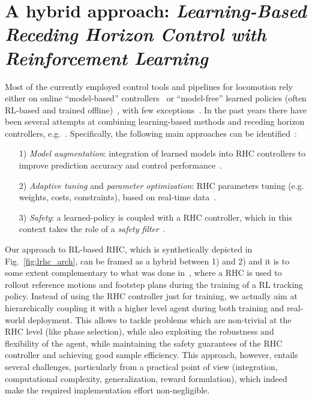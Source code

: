 \section{A hybrid approach: \textnormal{\textit{Learning-Based Receding Horizon Control with Reinforcement Learning}}}
Most of the currently employed control tools and pipelines for locomotion rely either on online ``model-based'' controllers~\cite{modern_mpc:grandia2023perceptive,web::atlas_grip_boston_dyn} or ``model-free'' learned policies (often RL-based and trained offline)~\cite{mpc_learn:aswani2012provably, mpc_learn:terzi2018learning, mpc_learn:soloperto2018learning, rl:schneider2023learning, rl:miki2024learning,mpc_learn:berkenkamp2016safe,mpc_learn:marco2016automatic,mpc_learn:brunner2015stabilizing,mpc_learn:rosolia2019learning,mpc_learn:englert2017inverse,mpc_learn:koller2018learning,mpc_learn:wabersich2021probabilistic,mpc_learn:gillulay2011guaranteed,mpc_learn:wabersich2018safe,mpc_learn:berkenkamp2017safe}, with few exceptions~\cite{hybrid_rl_to:Jenelten_2024}.
In the past years there have been several attempts at combining learning-based methods and receding horizon controllers, e.g.~\cite{mpc_learn:tsounis2020deepgait,mpc_learn:gangapurwala2021real}. Specifically, the following main approaches can be identified~\cite{mpc_learn:hewing2020learning}:
\begin{itemize}
	\item[1)] \textit{Model augmentation}: integration of learned models into RHC controllers to improve prediction accuracy and control performance~\cite{mpc_learn:aswani2012provably,mpc_learn:terzi2018learning,mpc_learn:soloperto2018learning}.
	\item[2)] \textit{Adaptive tuning} and \textit{parameter optimization}: RHC parameters tuning (e.g. weights, costs, constraints), based on real-time data~\cite{mpc_learn:berkenkamp2016safe,mpc_learn:marco2016automatic,mpc_learn:brunner2015stabilizing,mpc_learn:rosolia2019learning,mpc_learn:englert2017inverse}.
	\item[3)] \textit{Safety}: a learned-policy is coupled with a RHC controller, which in this context takes the role of a \textit{safety filter}~\cite{mpc_learn:koller2018learning,mpc_learn:wabersich2021probabilistic,mpc_learn:gillulay2011guaranteed,mpc_learn:wabersich2018safe,mpc_learn:berkenkamp2017safe}.
\end{itemize}
Our approach to RL-based RHC, which is synthetically depicted in Fig.~\ref{fig:lrhc_arch}, can be framed as a hybrid between 1) and 2) and it is to some extent complementary to what was done in~\cite{mpc_learn:hewing2020learning}, where a RHC is used to rollout reference motions and footstep plans during the training of a RL tracking policy. Instead of using the RHC controller just for training, we actually aim at hierarchically coupling it with a higher level agent during both training and real-world deployment. This allows to tackle problems which are non-trivial at the RHC level (like phase selection), while also exploiting the robustness and flexibility of the agent, while maintaining the safety guarantees of the RHC controller and achieving good sample efficiency. 
This approach, however, entails several challenges, particularly from a practical point of view (integration, computational complexity, generalization, reward formulation), which indeed make the required implementation effort non-negligible. 